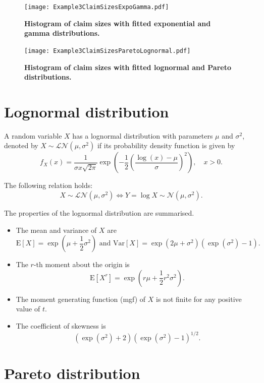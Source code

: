 \documentclass[
]{book}
\theoremstyle{definition}
\theoremstyle{definition}
\theoremstyle{definition}
\theoremstyle{definition}
\theoremstyle{remark}
\begin{document}
\begin{figure}
\hypertarget{FittedExpGamma}{%
\centering
\texttt{[image: Example3ClaimSizesExpoGamma.pdf]}
\caption{\textbf{Histogram of claim sizes with fitted exponential and gamma
distributions.}}\label{FittedExpGamma}
}
\end{figure}

\begin{figure}
\hypertarget{FittedLognormalPareto}{%
\centering
\texttt{[image: Example3ClaimSizesParetoLognormal.pdf]}
\caption{\textbf{Histogram of claim sizes with fitted lognormal and Pareto
distributions.}}\label{FittedLognormalPareto}
}
\end{figure}

\hypertarget{lognormal-distribution}{%
\section{Lognormal distribution}\label{lognormal-distribution}}

A random variable \(X\) has a lognormal distribution with parameters \(\mu\)
and \(\sigma^2\), denoted by \(X \sim \mathcal{LN}(\mu, \sigma^2)\) if its
probability density function is given by
\[f_X(x) = \frac{1}{\sigma x \sqrt{2 \pi}} \exp\left(-\frac{1}{2} \left( \frac{\log(x) - \mu}{\sigma} \right)^2 \right) , \quad x > 0.\]

The following relation holds:
\[X \sim \mathcal{LN}(\mu, \sigma^2)\Leftrightarrow Y = \log X \sim \mathcal{N}(\mu, \sigma^2).\]

The properties of the lognormal distribution are summarised.

\begin{itemize}
\item
  The mean and variance of \(X\) are
  \[\mathrm{E}[X] = \exp\left(\mu + \frac{1}{2} \sigma^2 \right) \text{ and } \mathrm{Var}[X] =\exp\left(2\mu +  \sigma^2 \right) (\exp(\sigma^2) - 1).\]
\item
  The \(r\)-th moment about the origin is
  \[\mathrm{E}[X^r] =\exp\left(r\mu +  \frac{1}{2}r^2 \sigma^2 \right).\]
\item
  The moment generating function (mgf) of \(X\) is not finite for any
  positive value of \(t\).
\item
  The coefficient of skewness is
  \[(\exp(\sigma^2)  + 2) \left(\exp(\sigma^2)  -1 \right)^{1/2} .\]
\end{itemize}

\hypertarget{pareto-distribution}{%
\section{Pareto distribution}\label{pareto-distribution}}
\end{document}
